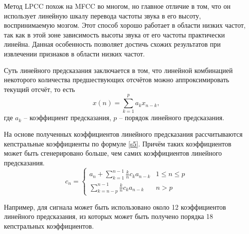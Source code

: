 Метод LPCC похож на MFCC во многом, но главное отличие в том, что он использует линейную шкалу перевода частоты звука в его высоту, воспринимаемую мозгом. Этот способ хорошо работает в области низких частот, так как в этой зоне зависимость высоты звука от его частоты практически линейна. Данная особенность позволяет достичь схожих	результатов при извлечении признаков в области низких частот. \cite{methodisb}


Суть линейного предсказания заключается в том, что линейной комбинацией некоторого количества предшествующих отсчётов можно аппроксимировать текущий отсчёт, то есть
\begin{equation}
	\label{H}
	x(n) = \sum_{k = 1}^{p} a_k x_{n-k},
\end{equation}
где $a_k$ -- коэффициент предсказания, $p$ -- порядок линейного предсказания.

На основе полученных коэффициентов линейного предсказания рассчитываются кепстральные коэффициенты по формуле \eqref{s5}. Причём таких коэффициентов может быть сгенерировано больше, чем самих коэффициентов линейного предсказания.
\begin{equation}
	\label{s5}
	c_n = \left\{\begin{matrix}
		a_n + \sum_{k=1}^{n-1} \frac{k}{n} c_k a_{n-k}& 1\leq n\leq p\\ 
		\sum_{k=n-p}^{n-1} \frac{k}{n} c_k a_{n-k}& n>p
	\end{matrix}\right.
\end{equation}

	
Например, для сигнала может быть использовано около 12 коэффициентов линейного предсказания, из которых может быть получено порядка 18 кепстральных коэффициентов. \cite{methodisb2}



